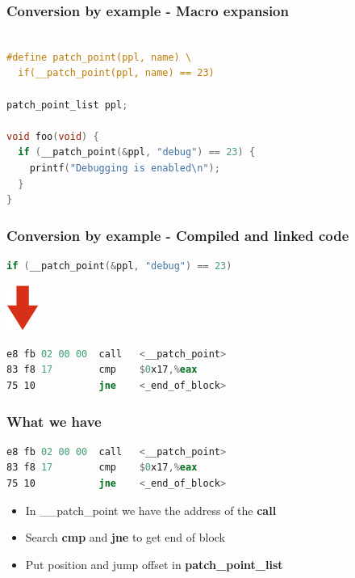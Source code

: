 \documentclass{beamer}
\begin{document}
\begin{frame}[fragile]\frametitle{Conversion by example - Macro expansion}
  \begin{lstlisting}[language=C,escapechar=`]

#define patch_point(ppl, name) \
  if(__patch_point(ppl, name) == 23)

patch_point_list ppl;

void foo(void) {
  if (__patch_point(&ppl, "debug") == 23) {
    printf("Debugging is enabled\n");
  }
}
\end{lstlisting}
\end{frame}


\begin{frame}[fragile]\frametitle{Conversion by example - Compiled and linked code}
\begin{lstlisting}[language=C,escapechar=`]
  if (__patch_point(&ppl, "debug") == 23)
\end{lstlisting}

\begin{center}
  \includegraphics[height=1.5cm]{pfeil}
\end{center}

\begin{lstlisting}[language=asm,escapechar=`]
e8 fb 02 00 00  call   <__patch_point>
83 f8 17        cmp    $0x17,%eax
75 10           jne    <_end_of_block>
\end{lstlisting}

\end{frame}

\begin{frame}[fragile]\frametitle{What we have}

\begin{lstlisting}[language=asm,escapechar=`]
e8 fb 02 00 00  call   <__patch_point>
83 f8 17        cmp    $0x17,%eax
75 10           jne    <_end_of_block>
\end{lstlisting}

\begin{itemize}
  \item<1-> In \alert{\_\_patch\_point} we have the address of the \textbf{call}
  \item<2-> Search \textbf{cmp} and \textbf{jne} to get end of block
  \item<3-> Put position and jump offset in \textbf{patch\_point\_list}
\end{itemize}
\end{frame}
\end{document}
